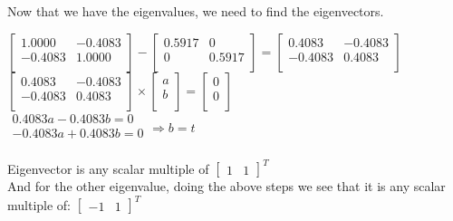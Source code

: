 \documentclass[12pt]{article}
\begin{document}
\noindent
Now that we have the eigenvalues, we need to find the eigenvectors.
\begin{center}

$
\begin{bmatrix}
1.0000 & -0.4083 \\
-0.4083 & 1.0000 \\
\end{bmatrix}
-
\begin{bmatrix}
0.5917 & 0 \\
0 & 0.5917 \\
\end{bmatrix}
=
\begin{bmatrix}
0.4083 & -0.4083 \\
-0.4083 & 0.4083 \\
\end{bmatrix}
$
\\[0.1 in]
$
\begin{bmatrix}
0.4083 & -0.4083 \\
-0.4083 & 0.4083 \\
\end{bmatrix}
\times
\begin{bmatrix}
a \\
b \\
\end{bmatrix}
=
\begin{bmatrix}
0 \\
0 \\
\end{bmatrix}
$
\\[0.1 in]
$
\begin{matrix}
0.4083a - 0.4083b = 0\\
-0.4083a + 0.4083b = 0 \\
\end{matrix}
\Rightarrow b=t
$
\\[0.1 in]
\end{center}
Eigenvector is any scalar multiple of
$
\begin{bmatrix}
1 & 1
\end{bmatrix}
^T
$
\\[0.1 in]
And for the other eigenvalue, doing the above steps we see that it is any scalar multiple of:
$
\begin{bmatrix}
-1 & 1
\end{bmatrix}
^T
$
\par
\end{document}
